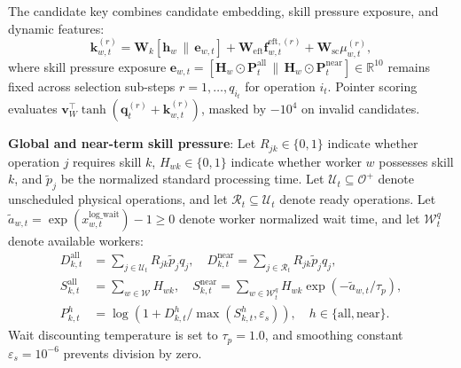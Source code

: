 \documentclass[journal,10pt]{IEEEtran}
\begin{document}
The candidate key combines candidate embedding, skill pressure exposure, and dynamic features:
\begin{equation}
\mathbf k_{w,t}^{(r)}=\mathbf W_k[\mathbf h_w\,\|\,\mathbf e_{w,t}]+\mathbf W_{\mathrm{eft}}\mathbf f_{w,t}^{\mathrm{eft},(r)}+\mathbf W_{\mathrm{sc}}\mu_{w,t}^{(r)},
\end{equation}
where skill pressure exposure $\mathbf e_{w,t} = [\mathbf H_w \odot \mathbf P_t^{\mathrm{all}} \,\|\, \mathbf H_w \odot \mathbf P_t^{\mathrm{near}}] \in \mathbb R^{10}$ remains fixed across selection sub-steps $r=1,\dots,q_{i_t}$ for operation $i_t$. Pointer scoring evaluates $\mathbf v_W^{\top}\tanh(\mathbf q_t^{(r)}+\mathbf k_{w,t}^{(r)})$, masked by $-10^4$ on invalid candidates.

\textbf{Global and near-term skill pressure}:
Let $R_{jk}\in\{0,1\}$ indicate whether operation $j$ requires skill $k$, $H_{wk}\in\{0,1\}$ indicate whether worker $w$ possesses skill $k$, and $\widetilde p_j$ be the normalized standard processing time. Let $\mathcal U_t\subseteq\mathcal O^+$ denote unscheduled physical operations, and let $\mathcal R_t\subseteq\mathcal U_t$ denote ready operations. Let $\widetilde a_{w,t} = \exp(x_{w,t}^{\mathrm{log\_wait}}) - 1 \ge 0$ denote worker normalized wait time, and let $\mathcal W_t^q$ denote available workers:
\begin{align}
D_{k,t}^{\mathrm{all}} &= \sum_{j\in\mathcal U_t} R_{jk}\widetilde p_j q_j, \quad D_{k,t}^{\mathrm{near}} = \sum_{j\in\mathcal R_t} R_{jk}\widetilde p_j q_j, \\
S_{k,t}^{\mathrm{all}} &= \sum_{w\in\mathcal W} H_{wk}, \quad S_{k,t}^{\mathrm{near}} = \sum_{w\in\mathcal W_t^q} H_{wk}\exp(-\widetilde a_{w,t}/\tau_p), \\
P_{k,t}^h &= \log\left(1 + D_{k,t}^h/\max(S_{k,t}^h, \varepsilon_s)\right), \quad h \in\{\mathrm{all},\mathrm{near}\}.
\end{align}
Wait discounting temperature is set to $\tau_p=1.0$, and smoothing constant $\varepsilon_s=10^{-6}$ prevents division by zero.
\end{document}
